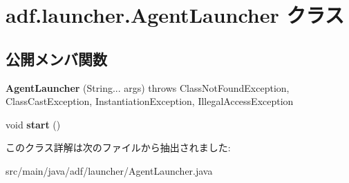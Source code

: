 \hypertarget{classadf_1_1launcher_1_1AgentLauncher}{}\section{adf.\+launcher.\+Agent\+Launcher クラス}
\label{classadf_1_1launcher_1_1AgentLauncher}
\subsection*{公開メンバ関数}
\begin{DoxyCompactItemize}
\item 
\hypertarget{classadf_1_1launcher_1_1AgentLauncher_af70a64943f3e3dc9af62f53f8aa110b5}{}\label{classadf_1_1launcher_1_1AgentLauncher_af70a64943f3e3dc9af62f53f8aa110b5} 
{\bfseries Agent\+Launcher} (String... args)  throws Class\+Not\+Found\+Exception, Class\+Cast\+Exception, Instantiation\+Exception, Illegal\+Access\+Exception     
\item 
\hypertarget{classadf_1_1launcher_1_1AgentLauncher_a949d5a6d55b71cb5fb7e3508e888499a}{}\label{classadf_1_1launcher_1_1AgentLauncher_a949d5a6d55b71cb5fb7e3508e888499a} 
void {\bfseries start} ()
\end{DoxyCompactItemize}


このクラス詳解は次のファイルから抽出されました\+:\begin{DoxyCompactItemize}
\item 
src/main/java/adf/launcher/Agent\+Launcher.\+java\end{DoxyCompactItemize}
